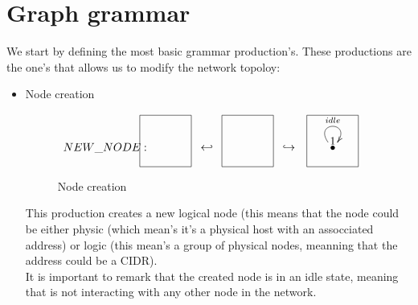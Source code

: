 \documentclass[envcountsect,runningheads]{llncs}
\begin{document}
\section{Graph grammar}

We start by defining the most basic grammar production's. These 
productions are the one's that allows us to modify the network topoloy:


\begin{itemize}
  \item Node creation
  \begin{figure}[H]
    \[
       \xymatrix@C=25pt@R=16pt
       {
         {}
         \POS[]-<4.5pc,0pc>\drop{NEW\_NODE:}
         \POS[]+<0pc,.5pc> *+=<3.8pc,3.8pc>[F-]{} & {\hookleftarrow} &
         {}
         \POS[]+<0pc,.5pc> *+=<3.8pc,3.8pc>[F-]{} & {\hookrightarrow} &
         {\bullet} \ar@(ul,ur)^{idle}
         \POS[]+<0pc,.5pc> *+=<3.8pc,3.8pc>[F-]{1} &
       }
    \]
    \caption{Node creation}
    \protect\label{fig:nodecreation}
  \end{figure}
  This production creates a new logical node (this means that 
  the node could be either physic (which mean's it's a physical host with an 
  assocciated address) or logic (this mean's a group of physical nodes, meanning
  that the address could be a CIDR). \\
  It is important to remark that the created node is in an idle state, meaning 
  that is not interacting with any other node in the network. \\ 
  \\
  

\end{itemize}
\end{document}
